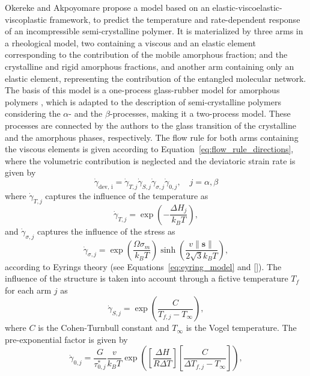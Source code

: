 Okereke and Akpoyomare \citep{okerekeTwoprocessConstitutiveModel2019} propose a model based on an elastic-viscoelastic-viscoplastic framework, to predict the temperature and rate-dependent response of an incompressible semi-crystalline polymer.
It is materialized by three arms in a rheological model, two containing a viscous and an elastic element corresponding to the contribution of the mobile amorphous fraction; and the crystalline and rigid amorphous fractions, and another arm containing only an elastic element, representing the contribution of the entangled molecular network.
The basis of this model is a one-process glass-rubber model for amorphous polymers \citep{buckleyGlassrubberConstitutiveModel1995}, which is adapted to the description of semi-crystalline polymers considering the $\alpha$- and the $\beta$-processes, making it a two-process model.
These processes are connected by the authors to the glass transition of the crystalline and the amorphous phases, respectively.
The flow rule for both arms containing the viscous elements is given according to Equation~\eqref{eq:flow_rule_directions}, where the volumetric contribution is neglected and the deviatoric strain rate is given by
\begin{equation}
	\dot \gamma_\text{dev, i} = \dot \gamma_{T,j}\dot\gamma_{S,j}\dot\gamma_{\sigma,j}\dot\gamma_{0,j},\quad j=\alpha, \beta
\end{equation}
where $\dot \gamma_{T,j}$ captures the influence of the temperature as
\begin{equation}
	\dot \gamma_{T,j} = \exp\left(-\frac{\Delta H_j}{k_B T}\right),
\end{equation}
and $\dot \gamma_{\sigma,j}$ captures the influence of the stress as
\begin{equation}
	\dot\gamma_{\sigma,j} = \exp\left(\frac{\Omega\sigma_m}{k_B T}\right)\sinh\left(\frac{v\|\mathbf s\|}{2\sqrt{3}k_BT}\right),
\end{equation}
according to Eyrings theory (see Equations~\eqref{eq:eyring_model} and \eqref{}).
The influence of the structure is taken into account through a fictive temperature $T_f$ for each arm $j$ as
\begin{equation}
	\dot\gamma_{S,j} = \exp\left(\frac{C}{T_{f,j}-T_\infty}\right),
\end{equation}
where $C$ is the Cohen-Turnbull constant and $T_\infty$ is the Vogel temperature.
The pre-exponential factor is given by
\begin{equation}
	\dot \gamma_{0,j} = \frac{G}{\tau^*_{0,j}} \frac{v}{k_B T}\exp\left(\left[\frac{\Delta H}{R\Delta T}\right]\left[\frac{C}{\Delta T_{f,j} - T_\infty}\right]\right),
\end{equation}
